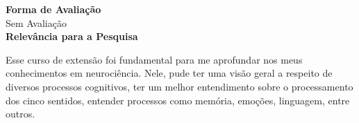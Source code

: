 \textbf{Forma de Avaliação}\\
\hspace*{1.6em}Sem Avaliação\\

\textbf{Relevância para a Pesquisa}

Esse curso de extensão foi fundamental para me aprofundar nos meus conhecimentos em neurociência. Nele, pude ter uma visão geral a respeito de diversos processos cognitivos, ter um melhor entendimento sobre o processamento dos cinco sentidos, entender processos como memória, emoções, linguagem, entre outros.\\



